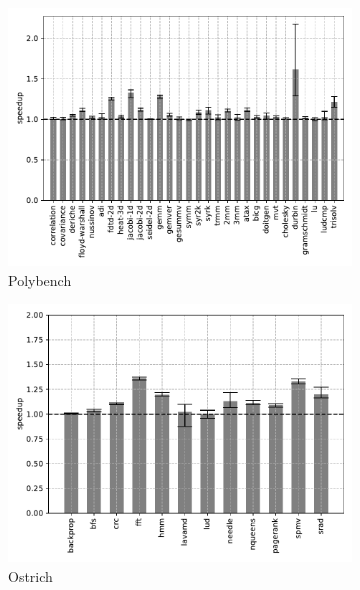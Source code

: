 \begin{figure}
    \centering
    \begin{subfigure}[t]{\textwidth}
        \includegraphics[width=\textwidth]
        {Images/6.1.RQ1/polybench-wasmtime-opt.pdf}
        \caption{Polybench}
        \label{fig:rq1-wasmtime-opt-polybench}
    \end{subfigure}
    \begin{subfigure}[t]{.45\textwidth}
        \includegraphics[width=\textwidth]
        {Images/6.1.RQ1/ostrich-wasmtime-opt.pdf}
        \caption{Ostrich}
    \end{subfigure}
    \begin{subfigure}[t]{.45\textwidth}

\end{subfigure}
\end{figure}
